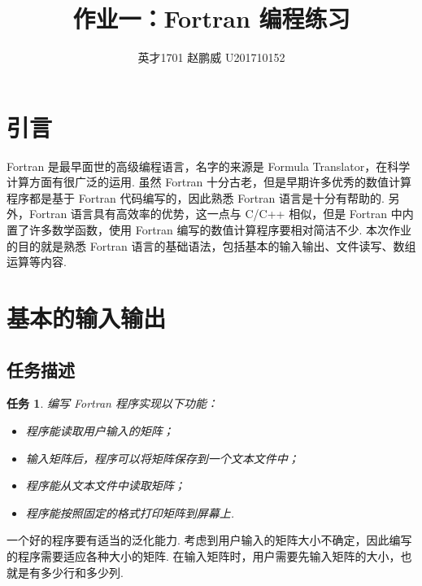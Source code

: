 \documentclass{article}
\title{作业一：Fortran 编程练习}
\author{英才1701 赵鹏威 U201710152}
\newtheorem{task}{任务}
\begin{document}
	\maketitle
	\tableofcontents
	\newpage
	\section{引言}
	Fortran 是最早面世的高级编程语言，名字的来源是 Formula Translator，在科学计算方面有很广泛的运用. 虽然 Fortran 十分古老，但是早期许多优秀的数值计算程序都是基于 Fortran 代码编写的，因此熟悉 Fortran 语言是十分有帮助的. 另外，Fortran 语言具有高效率的优势，这一点与 C/C++ 相似，但是 Fortran 中内置了许多数学函数，使用 Fortran 编写的数值计算程序要相对简洁不少. 本次作业的目的就是熟悉 Fortran 语言的基础语法，包括基本的输入输出、文件读写、数组运算等内容.
	
	\section{基本的输入输出}
	\subsection{任务描述}
	\begin{task}
		编写 Fortran 程序实现以下功能：
		\begin{itemize}
			\item 程序能读取用户输入的矩阵；
			\item 输入矩阵后，程序可以将矩阵保存到一个文本文件中；
			\item 程序能从文本文件中读取矩阵；
			\item 程序能按照固定的格式打印矩阵到屏幕上.
		\end{itemize}
	\end{task}
	一个好的程序要有适当的泛化能力. 考虑到用户输入的矩阵大小不确定，因此编写的程序需要适应各种大小的矩阵. 在输入矩阵时，用户需要先输入矩阵的大小，也就是有多少行和多少列.
\end{document}
